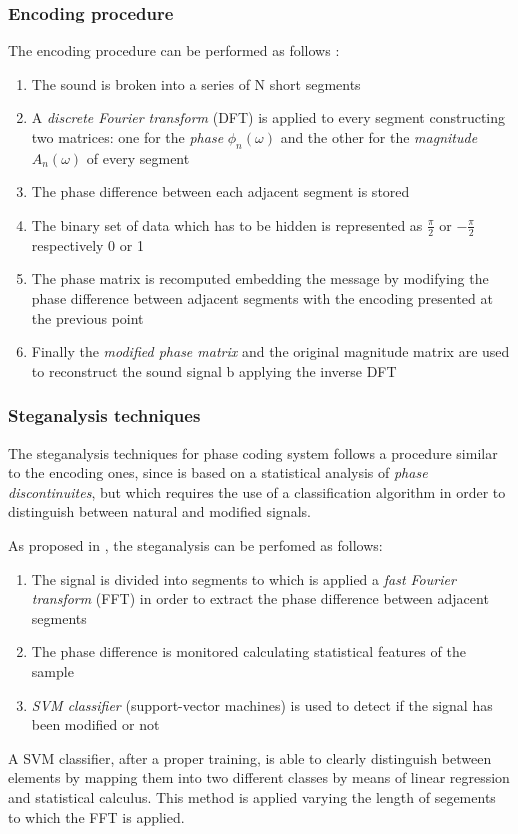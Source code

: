 \documentclass[../../main.tex]{subfiles}
\begin{document}
\subsubsection{Encoding procedure}
The encoding procedure can be performed as follows
\cite{techniques-data-hiding}:
\begin{enumerate}
    \item The sound is broken into a series of N short segments
    \item A \emph{discrete Fourier transform} (DFT) is applied to every
        segment constructing two matrices: one for the \emph{phase}
        $\phi_n(\omega)$ and the other for the \emph{magnitude}
        $A_n(\omega)$ of every segment
    \item The phase difference between each adjacent segment is stored
    \item The binary set of data which has to be hidden is represented as
        $\frac{\pi}{2}$ or $-\frac{\pi}{2}$ respectively 0 or 1
    \item The phase matrix is recomputed embedding the message by modifying
        the phase difference between adjacent segments with the encoding
        presented at the previous point
    \item Finally the \emph{modified phase matrix} and the original
        magnitude matrix are used to reconstruct the sound signal b
        applying the inverse DFT
\end{enumerate}

\subsubsection{Steganalysis techniques}
The steganalysis techniques for phase coding system follows a
procedure similar to the encoding ones, since is based on a statistical
analysis of \emph{phase discontinuites}, but which requires the use of a
classification algorithm in order to distinguish between natural and
modified signals.

As proposed in \cite{steganalysis-phase-coding}, the steganalysis can be
perfomed as follows:
\begin{enumerate}
    \item The signal is divided into segments to which is applied a
        \emph{fast Fourier transform} (FFT) in order to extract the phase
        difference between adjacent segments
    \item The phase difference is monitored calculating statistical features
        of the sample
    \item \emph{SVM classifier} (support-vector machines) is used to
        detect if the signal has been modified or not
\end{enumerate}
A SVM classifier, after a proper training, is able to clearly distinguish
between elements by mapping them into two different classes by means of
linear regression and statistical calculus.
This method is applied varying the length of segements to which the FFT is
applied.
\end{document}
